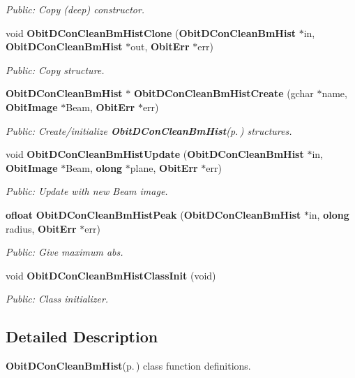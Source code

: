 \begin{CompactItemize}
\begin{CompactList}\small\item\em Public: Copy (deep) constructor. \item\end{CompactList}\item 
void {\bf Obit\-DCon\-Clean\-Bm\-Hist\-Clone} ({\bf Obit\-DCon\-Clean\-Bm\-Hist} $\ast$in, {\bf Obit\-DCon\-Clean\-Bm\-Hist} $\ast$out, {\bf Obit\-Err} $\ast$err)
\begin{CompactList}\small\item\em Public: Copy structure. \item\end{CompactList}\item 
{\bf Obit\-DCon\-Clean\-Bm\-Hist} $\ast$ {\bf Obit\-DCon\-Clean\-Bm\-Hist\-Create} (gchar $\ast$name, {\bf Obit\-Image} $\ast$Beam, {\bf Obit\-Err} $\ast$err)
\begin{CompactList}\small\item\em Public: Create/initialize {\bf Obit\-DCon\-Clean\-Bm\-Hist}{\rm (p.\,\pageref{structObitDConCleanBmHist})} structures. \item\end{CompactList}\item 
void {\bf Obit\-DCon\-Clean\-Bm\-Hist\-Update} ({\bf Obit\-DCon\-Clean\-Bm\-Hist} $\ast$in, {\bf Obit\-Image} $\ast$Beam, {\bf olong} $\ast$plane, {\bf Obit\-Err} $\ast$err)
\begin{CompactList}\small\item\em Public: Update with new Beam image. \item\end{CompactList}\item 
{\bf ofloat} {\bf Obit\-DCon\-Clean\-Bm\-Hist\-Peak} ({\bf Obit\-DCon\-Clean\-Bm\-Hist} $\ast$in, {\bf olong} radius, {\bf Obit\-Err} $\ast$err)
\begin{CompactList}\small\item\em Public: Give maximum abs. \item\end{CompactList}\item 
void {\bf Obit\-DCon\-Clean\-Bm\-Hist\-Class\-Init} (void)
\begin{CompactList}\small\item\em Public: Class initializer. \item\end{CompactList}\end{CompactItemize}


\subsection{Detailed Description}
{\bf Obit\-DCon\-Clean\-Bm\-Hist}{\rm (p.\,\pageref{structObitDConCleanBmHist})} class function definitions. 

